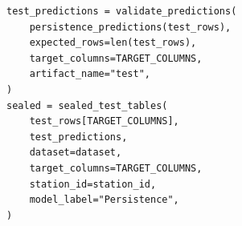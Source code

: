 \begin{verbatim}
test_predictions = validate_predictions(
    persistence_predictions(test_rows),
    expected_rows=len(test_rows),
    target_columns=TARGET_COLUMNS,
    artifact_name="test",
)
sealed = sealed_test_tables(
    test_rows[TARGET_COLUMNS],
    test_predictions,
    dataset=dataset,
    target_columns=TARGET_COLUMNS,
    station_id=station_id,
    model_label="Persistence",
)
\end{verbatim}
